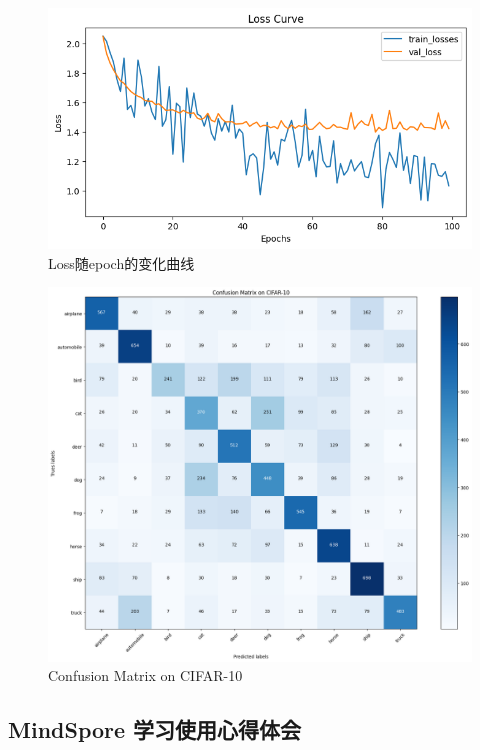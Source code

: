 \documentclass[12pt]{article}
\begin{document}
\begin{figure}[htbp]
  \centering
  \includegraphics[scale=0.75]{figures/nn/loss_curve.png}
  \caption{Loss随epoch的变化曲线}
  \label{fig:loss_curve}
\end{figure}


\begin{figure}[htbp]
  \centering
  \includegraphics[scale=0.5]{figures/nn/confusion_matrix.png}
  \caption{Confusion Matrix on CIFAR-10}
  \label{fig:confusion_matrix}
\end{figure}


\subsection{MindSpore 学习使用心得体会}
\end{document}
